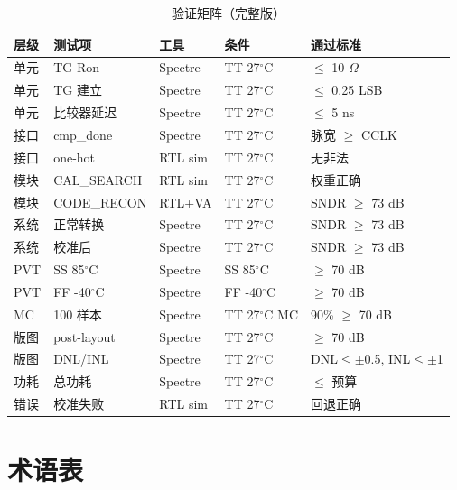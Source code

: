 \documentclass[UTF8,a4paper,11pt]{ctexart}
\providecommand{\textOmega}{\ensuremath{\Omega}}
\begin{document}
\begin{table}[H]
\centering
\caption{验证矩阵（完整版）}
\label{tab:app-verify-matrix}
\scriptsize
\begin{tabular}{llllp{2.5cm}}
\toprule
层级 & 测试项 & 工具 & 条件 & 通过标准 \\
\midrule
单元  & TG Ron        & Spectre  & TT 27$^\circ$C & $\leq$ 10 \textOmega \\
单元  & TG 建立       & Spectre  & TT 27$^\circ$C & $\leq$ 0.25 LSB \\
单元  & 比较器延迟    & Spectre  & TT 27$^\circ$C & $\leq$ 5 ns \\
接口  & cmp\_done     & Spectre  & TT 27$^\circ$C & 脉宽 $\geq$ CCLK \\
接口  & one-hot       & RTL sim  & TT 27$^\circ$C & 无非法 \\
模块  & CAL\_SEARCH   & RTL sim  & TT 27$^\circ$C & 权重正确 \\
模块  & CODE\_RECON   & RTL+VA   & TT 27$^\circ$C & SNDR $\geq$ 73 dB \\
系统  & 正常转换      & Spectre  & TT 27$^\circ$C & SNDR $\geq$ 73 dB \\
系统  & 校准后        & Spectre  & TT 27$^\circ$C & SNDR $\geq$ 73 dB \\
PVT   & SS 85$^\circ$C  & Spectre & SS 85$^\circ$C  & $\geq$ 70 dB \\
PVT   & FF -40$^\circ$C & Spectre & FF -40$^\circ$C & $\geq$ 70 dB \\
MC    & 100 样本     & Spectre  & TT 27$^\circ$C MC & 90\% $\geq$ 70 dB \\
版图  & post-layout  & Spectre  & TT 27$^\circ$C & $\geq$ 70 dB \\
版图  & DNL/INL       & Spectre  & TT 27$^\circ$C & DNL$\leq$$\pm$0.5, INL$\leq$$\pm$1 \\
功耗  & 总功耗        & Spectre  & TT 27$^\circ$C & $\leq$ 预算 \\
错误  & 校准失败      & RTL sim  & TT 27$^\circ$C & 回退正确 \\
\bottomrule
\end{tabular}
\end{table}

\section{术语表}
\label{app:glossary}
\end{document}
